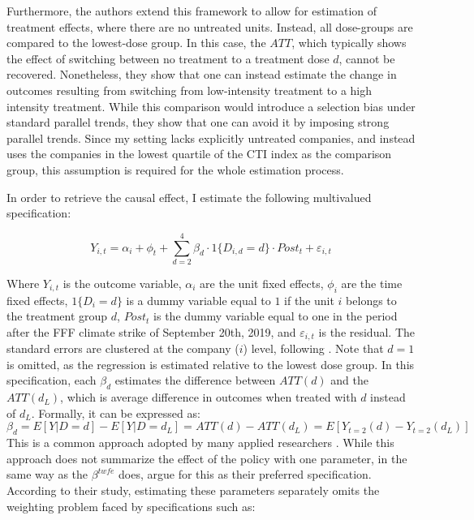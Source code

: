\documentclass[12pt]{article}
\begin{document}
Furthermore, the authors extend this framework to allow for estimation of treatment effects, where there are no untreated units. Instead, all dose-groups are compared to the lowest-dose group. In this case, the $ATT$, which typically shows the effect of switching between no treatment to a treatment dose $d$, cannot be recovered. Nonetheless, they show that one can instead estimate the change in outcomes resulting from switching from low-intensity treatment to a high intensity treatment. While this comparison would introduce a selection bias under standard parallel trends, they show that one can avoid it by imposing strong parallel trends. Since my setting lacks explicitly untreated companies, and instead uses the companies in the lowest quartile of the CTI index as the comparison group, this assumption is required for the whole estimation process.


In order to retrieve the causal effect, I estimate the following multivalued specification:

\begin{equation}
    Y_{i,t} = \alpha_i + \phi_t + \sum_{d=2}^{4} \beta_d \cdot 1\{D_{i,d}=d\}\cdot Post_t + \varepsilon_{i,t}
\end{equation}

Where $Y_{i,t}$ is the outcome variable, $\alpha_i$ are the unit fixed effects, $\phi_i$ are the time fixed effects, $1\{D_{i}=d\}$ is a dummy variable equal to $1$ if the unit $i$ belongs to the treatment group $d$, $Post_t$ is the dummy variable equal to one in the period after the FFF climate strike of September 20th, 2019, and $\varepsilon_{i,t}$ is the residual. The standard errors are clustered at the company ($i$) level, following \textcite{abadieWhenShouldYou2022}. Note that $d=1$ is omitted, as the regression is estimated relative to the lowest dose group. In this specification, each $\beta_d$ estimates the difference between $ATT(d)$ and the $ATT(d_L)$, which is average difference in outcomes when treated with $d$ instead of $d_L$. Formally, it can be expressed as: 
\begin{equation}
    \beta_d = E[Y|D = d] - E[Y |D = d_L] = ATT(d) - ATT(d_L) = E[Y_{t=2}(d) - Y_{t=2}(d_L)]
\end{equation}
This is a common approach adopted by many applied researchers \parencite{acemoglu_finkelstein_medicare,deschenes_greenstone_clim_change}. While this approach does not summarize the effect of the policy with one parameter, in the same way as the $\beta^{twfe}$ does, \citeauthor{callawayDifferenceinDifferencesContinuousTreatment2025} argue for this as their preferred specification. According to their study, estimating these parameters separately omits the weighting problem faced by specifications such as:
\end{document}
